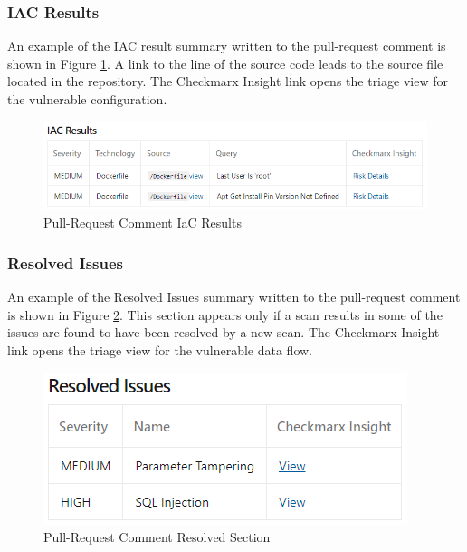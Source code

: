 \subsubsection{IAC Results}

An example of the IAC result summary written to the pull-request comment
is shown in Figure
\ref{fig:pr-iac-section}. A
link to the line of the source code leads to the source file located in the
repository.  The Checkmarx Insight link opens the triage view for the vulnerable
configuration.

\begin{figure}[ht]
    \includegraphics[width=\textwidth]{graphics/pr-iac.png}
    \caption{Pull-Request Comment IaC Results}
    \label{fig:pr-iac-section}
\end{figure}

\subsubsection{Resolved Issues}

An example of the Resolved Issues summary written to the pull-request comment
is shown in Figure
\ref{fig:pr-resolved-section}. This section appears only if a scan results in
some of the issues are found to have been resolved by a new scan.
The Checkmarx Insight link opens the triage view for the vulnerable
data flow.

\begin{figure}[ht]
    \includegraphics[width=\textwidth]{graphics/pr-resolved.png}
    \caption{Pull-Request Comment Resolved Section}
    \label{fig:pr-resolved-section}
\end{figure}

